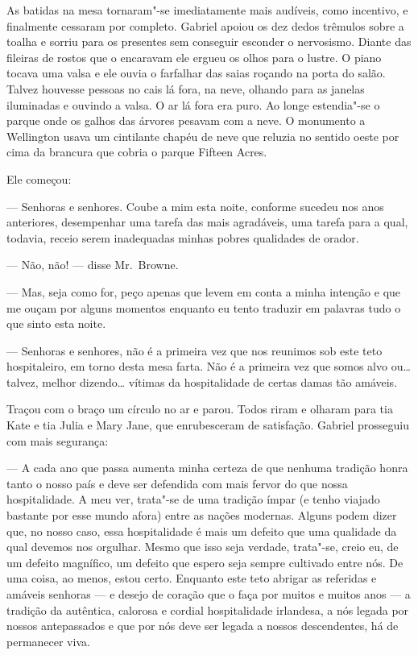 As batidas na mesa tornaram"-se imediatamente mais audíveis, como incentivo, e
finalmente cessaram por completo.  Gabriel apoiou os dez dedos trêmulos sobre a
toalha e sorriu para os presentes sem conseguir esconder o nervosismo.  Diante
das fileiras de rostos que o encaravam ele ergueu os olhos para o lustre.  O
piano tocava uma valsa e ele ouvia o farfalhar das saias roçando na porta do
salão.  Talvez houvesse pessoas no cais lá fora, na neve, olhando para as
janelas iluminadas e ouvindo a valsa.  O ar lá fora era puro.  Ao longe
estendia"-se o parque onde os galhos das árvores pesavam com a neve.  O
monumento a Wellington usava um cintilante chapéu de neve que reluzia no
sentido oeste por cima da brancura que cobria o parque Fifteen Acres.

Ele começou:

--- Senhoras e senhores.  Coube a mim esta noite, conforme sucedeu nos anos
anteriores, desempenhar uma tarefa das mais agradáveis, uma tarefa para a qual,
todavia, receio serem inadequadas minhas pobres qualidades de orador.

--- Não, não! --- disse Mr.~Browne.

--- Mas, seja como for, peço apenas que levem em conta a minha intenção e que
me ouçam por alguns momentos enquanto eu tento traduzir em palavras tudo o que
sinto esta noite.

--- Senhoras e senhores, não é a primeira vez que nos reunimos sob este teto
hospitaleiro, em torno desta mesa farta.  Não é a primeira vez que somos alvo
ou\ldots{} talvez, melhor dizendo\ldots{} vítimas da hospitalidade de certas
damas tão amáveis.

Traçou com o braço um círculo no ar e parou.  Todos riram e olharam para tia
Kate e tia Julia e Mary Jane, que enrubesceram de satisfação.  Gabriel
prosseguiu com mais segurança:

--- A cada ano que passa aumenta minha certeza de que nenhuma tradição honra
tanto o nosso país e deve ser defendida com mais fervor do que nossa
hospitalidade.  A meu ver, trata"-se de uma tradição ímpar (e tenho viajado
bastante por esse mundo afora) entre as nações modernas.  Alguns podem dizer
que, no nosso caso, essa hospitalidade é mais um defeito que uma qualidade da
qual devemos nos orgulhar.  Mesmo que isso seja verdade, trata"-se, creio eu, de
um defeito magnífico, um defeito que espero seja sempre cultivado entre nós.
De uma coisa, ao menos, estou certo.  Enquanto este teto abrigar as referidas e
amáveis senhoras --- e desejo de coração que o faça por muitos e muitos anos
--- a tradição da autêntica, calorosa e cordial hospitalidade irlandesa, a nós
legada por nossos antepassados e que por nós deve ser legada a nossos
descendentes, há de permanecer viva.

